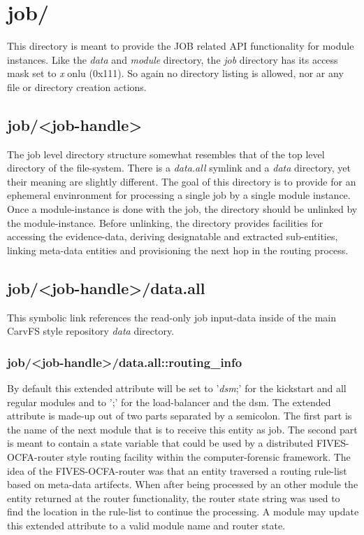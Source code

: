 \section{job/}
This directory is meant to provide the JOB related API functionality for module instances. Like the \emph{data} and \emph{module} directory, the \emph{job} directory has its access mask set to \emph{x} onlu (0x111). So again no directory listing is allowed, nor ar any file or directory creation actions.
\subsection{job/<job-handle>}
The job level directory structure somewhat resembles that of the top level directory of the file-system. There is a \emph{data.all} symlink and a \emph{data} directory, yet their meaning are slightly different. The goal of this directory is to provide for an ephemeral envinronment for processing a single job by a single module instance. Once a module-instance is done with the job, the directory should be unlinked by the module-instance. Before unlinking, the directory provides facilities for accessing the evidence-data, deriving designatable and extracted sub-entities, linking meta-data entities and provisioning the next hop in the routing process. 
\subsection{job/<job-handle>/data.all}
This symbolic link references the read-only job input-data inside of the main CarvFS style repository \emph{data} directory.
\subsubsection{job/<job-handle>/data.all::routing\_info}
By default this extended attribute will be set to '\emph{dsm};' for the kickstart and all regular modules and to ';' for the load-balancer and the dsm. 
The extended attribute is made-up out of two parts separated by a semicolon. The first part is the name of the next module that is to receive this entity as job. The second part is meant to contain a state variable that could be used by a distributed FIVES-OCFA-router style routing facility within the computer-forensic framework. The idea of the FIVES-OCFA-router was that an entity traversed a routing rule-list based on meta-data artifects. When after being processed by an other module the entity returned at the router functionality, the router state string was used to find the location in the rule-list to continue the processing.
A module may update this extended attribute to a valid module name and router state.
